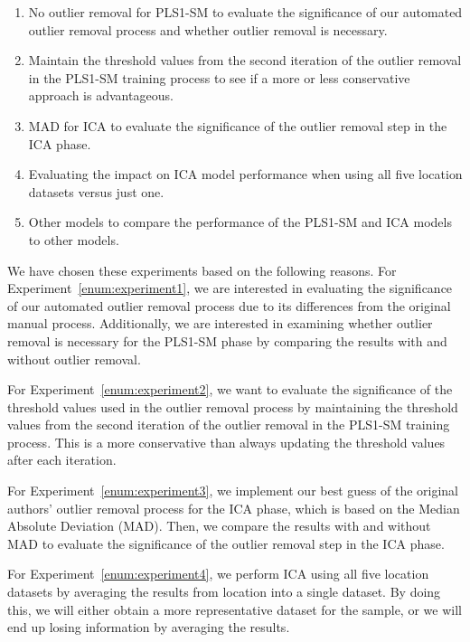 \begin{enumerate}
	\item\label{enum:experiment1} No outlier removal for PLS1-SM to evaluate the significance of our automated outlier removal process and whether outlier removal is necessary.
	\item\label{enum:experiment2} Maintain the threshold values from the second iteration of the outlier removal in the PLS1-SM training process to see if a more or less conservative approach is advantageous.
	\item\label{enum:experiment3} MAD for ICA to evaluate the significance of the outlier removal step in the ICA phase.
	\item\label{enum:experiment4} Evaluating the impact on ICA model performance when using all five location datasets versus just one.
	\item\label{enum:experiment5} Other models to compare the performance of the PLS1-SM and ICA models to other models.
\end{enumerate}

\noindent
We have chosen these experiments based on the following reasons.
For Experiment~\ref{enum:experiment1}, we are interested in evaluating the significance of our automated outlier removal process due to its differences from the original manual process.
Additionally, we are interested in examining whether outlier removal is necessary for the PLS1-SM phase by comparing the results with and without outlier removal.

For Experiment~\ref{enum:experiment2}, we want to evaluate the significance of the threshold values used in the outlier removal process by maintaining the threshold values from the second iteration of the outlier removal in the PLS1-SM training process.
This is a more conservative than always updating the threshold values after each iteration.

For Experiment~\ref{enum:experiment3}, we implement our best guess of the original authors' outlier removal process for the ICA phase, which is based on the Median Absolute Deviation (MAD).
Then, we compare the results with and without MAD to evaluate the significance of the outlier removal step in the ICA phase.

For Experiment~\ref{enum:experiment4}, we perform ICA using all five location datasets by averaging the results from location into a single dataset.
By doing this, we will either obtain a more representative dataset for the sample, or we will end up losing information by averaging the results.

